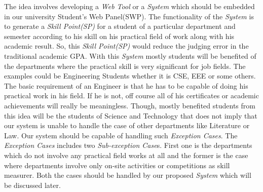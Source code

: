 \documentclass[conference]{IEEEtran}
\begin{document}
 The idea involves developing a \textit{Web Tool} or a \textit{System} which should be embedded in our university Student's Web Panel(SWP). The functionality of the \textit{System} is to generate a \textit{Skill Point(SP)} for a student of a particular department and semester according to his skill on his practical field of work along with his academic result. So, this \textit{Skill Point(SP)} would reduce the judging error in the traditional academic GPA. With this \textit{System} mostly students will be benefited of the departments where the practical skill is very significant for job fields. The examples could be Engineering Students whether it is CSE, EEE or some others. The basic requirement of an Engineer is that he has to be capable of doing his practical work in his field. If he is not, off  course all of his certificates or academic achievements will really be meaningless. Though, mostly benefited students from this idea will be the students of Science and Technology that does not imply that our system is unable to handle the case of other departments like Literature or Law. Our system should be capable of handling such \textit{Exception Cases}. The \textit{Exception Cases} includes two \textit{Sub-exception Case}s. First one is the departments which do not involve any practical field works at all and the former is the case where departments involve only on-site activities or competitions as skill measurer. Both the cases should be handled by our proposed \textit{System} which will be discussed later.  
 \\
 \\
 \\
 
\end{document}
